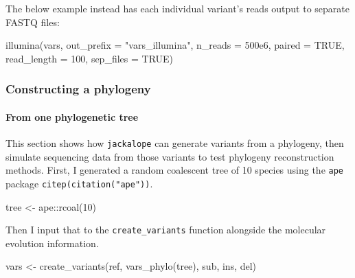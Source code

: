 \documentclass[12pt,]{article}
\newenvironment{Shaded}{}{}
\newcommand{\DataTypeTok}[1]{#1}
\newcommand{\DecValTok}[1]{#1}
\newcommand{\FloatTok}[1]{#1}
\newcommand{\KeywordTok}[1]{\textcolor[rgb]{0.00,0.00,1.00}{#1}}
\newcommand{\NormalTok}[1]{#1}
\newcommand{\OperatorTok}[1]{#1}
\newcommand{\OtherTok}[1]{\textcolor[rgb]{1.00,0.25,0.00}{#1}}
\newcommand{\StringTok}[1]{\textcolor[rgb]{0.00,0.50,0.50}{#1}}
\let\oldparagraph\paragraph
\renewcommand{\paragraph}[1]{\oldparagraph{#1}\mbox{}}
\begin{document}
The below example instead has each individual variant's reads output to separate
FASTQ files:

\begin{Shaded}
\begin{Highlighting}[]
\KeywordTok{illumina}\NormalTok{(vars, }\DataTypeTok{out_prefix =} \StringTok{"vars_illumina"}\NormalTok{, }\DataTypeTok{n_reads =} \FloatTok{500e6}\NormalTok{, }\DataTypeTok{paired =} \OtherTok{TRUE}\NormalTok{,}
         \DataTypeTok{read_length =} \DecValTok{100}\NormalTok{, }\DataTypeTok{sep_files =} \OtherTok{TRUE}\NormalTok{)}
\end{Highlighting}
\end{Shaded}

\hypertarget{constructing-a-phylogeny}{%
\subsubsection{Constructing a phylogeny}\label{constructing-a-phylogeny}}

\hypertarget{from-one-phylogenetic-tree}{%
\paragraph{From one phylogenetic tree}\label{from-one-phylogenetic-tree}}

This section shows how \texttt{jackalope} can generate variants from a phylogeny, then
simulate sequencing data from those variants to test phylogeny reconstruction methods.
First, I generated a random coalescent tree of 10 species using the \texttt{ape} package
\texttt{citep(citation("ape"))}.

\begin{Shaded}
\begin{Highlighting}[]
\NormalTok{tree <-}\StringTok{ }\NormalTok{ape}\OperatorTok{::}\KeywordTok{rcoal}\NormalTok{(}\DecValTok{10}\NormalTok{)}
\end{Highlighting}
\end{Shaded}

Then I input that to the \texttt{create\_variants} function alongside the molecular evolution
information.

\begin{Shaded}
\begin{Highlighting}[]
\NormalTok{vars <-}\StringTok{ }\KeywordTok{create_variants}\NormalTok{(ref, }\KeywordTok{vars_phylo}\NormalTok{(tree), sub, ins, del)}
\end{Highlighting}
\end{Shaded}
\end{document}
